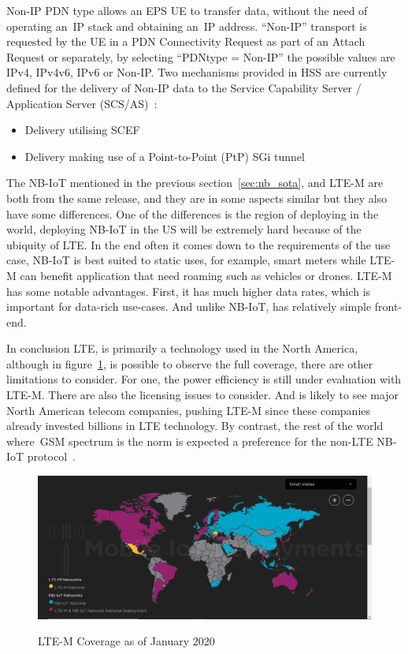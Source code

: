 Non-IP PDN type allows an EPS UE to transfer data,  without the need of  operating an~\gls{IP} stack and obtaining an~\gls{IP} address. “Non-IP” transport is requested by the UE in a PDN Connectivity Request as part of an Attach Request or separately, by selecting “PDNtype = Non-IP” the possible values are IPv4, IPv4v6, IPv6 or Non-IP. Two mechanisms provided in HSS are currently defined for
the delivery of Non-IP data to the Service Capability Server / Application Server (SCS/AS)~\cite{LTE-M}:
\begin{itemize}
	\item Delivery utilising SCEF
	\item Delivery making use of  a Point-to-Point (PtP) SGi tunnel

\end{itemize} 

The NB-IoT mentioned in the previous section~\ref{sec:nb_sota}, and LTE-M are both from the same release, and they are in some aspects similar but they also have some differences. One of the differences is the region of deploying in the world, deploying NB-IoT in the US will be extremely hard because of the ubiquity of LTE. 
In the end often it comes down to the requirements of the use case, NB-IoT is best suited to static uses,  for example,  smart meters while LTE-M can benefit application that need  roaming  such as vehicles or drones. LTE-M has some notable advantages. First, it has much higher data rates, which is important for data-rich use-cases. And unlike NB-IoT, has relatively simple front-end.


In conclusion LTE, is primarily a technology used in the North America, although in figure~\ref{fig:LTE-M}, is possible to observe the full coverage, there are other limitations to consider. For one, the power efficiency is still under evaluation with LTE-M. There are also the licensing issues to consider.
And is likely to see major North American telecom companies, pushing LTE-M since these companies already invested billions in LTE technology. By contrast,  the rest of the world where~\gls{GSM} spectrum is the norm is expected  a preference for the non-LTE NB-IoT protocol~\cite{Hwang2018}.


\begin{figure}[htbp]

  \centering
  
    {\includegraphics[height=2 in,width=0.75\linewidth]{Chapters/Figures/LTE-coverage.JPG}}%
 
  \caption{LTE-M Coverage as of January 2020~\cite{IoTCoverage}}
  \label{fig:LTE-M}
  
\end{figure}


